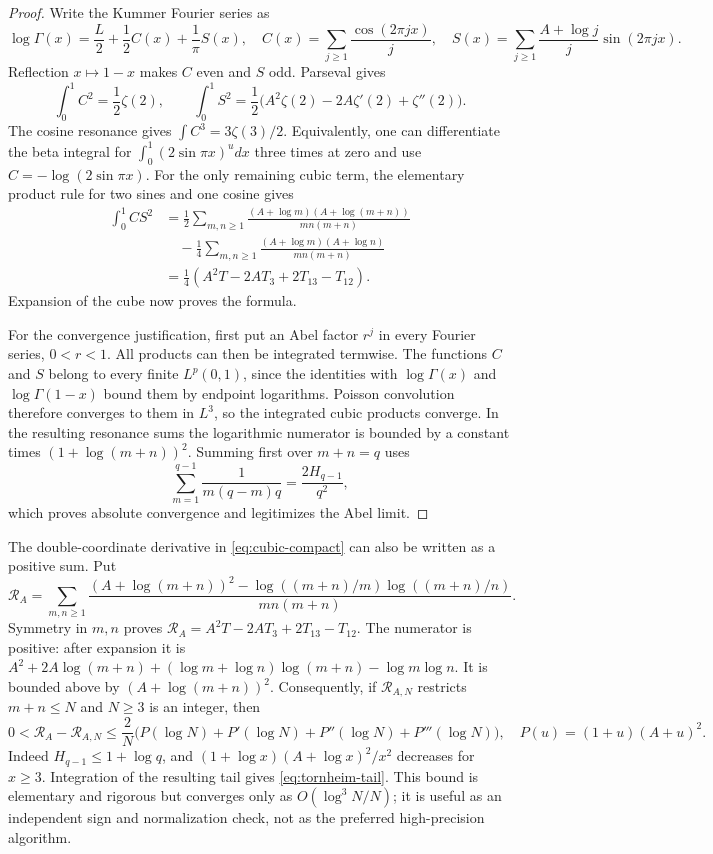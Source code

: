 \begin{proof}
Write the Kummer Fourier series as
\[
 \log\Gamma(x)=\frac L2+\frac12 C(x)+\frac1\pi S(x),
 \quad C(x)=\sum_{j\ge1}\frac{\cos(2\pi jx)}j,
 \quad S(x)=\sum_{j\ge1}\frac{A+\log j}{j}\sin(2\pi jx).
\]
Reflection $x\mapsto1-x$ makes $C$ even and $S$ odd.  Parseval gives
\[
 \int_0^1 C^2=\frac12\zeta(2),\qquad
 \int_0^1 S^2=\frac12\bigl(A^2\zeta(2)-2A\zeta'(2)+\zeta''(2)\bigr).
\]
The cosine resonance gives $\int C^3=3\zeta(3)/2$.  Equivalently, one can
differentiate the beta integral for $\int_0^1(2\sin\pi x)^u dx$ three times
at zero and use $C=-\log(2\sin\pi x)$.
For the only remaining cubic term, the elementary product rule for two sines
and one cosine gives
\begin{align*}
 \int_0^1 CS^2
 &=\frac12\sum_{m,n\ge1}
   \frac{(A+\log m)(A+\log(m+n))}{mn(m+n)}\\
 &\hspace{1em}-\frac14\sum_{m,n\ge1}
   \frac{(A+\log m)(A+\log n)}{mn(m+n)}\\
 &=\frac14\left(A^2T-2AT_3+2T_{13}-T_{12}\right).
\end{align*}
Expansion of the cube now proves the formula.

For the convergence justification, first put an Abel factor $r^j$ in every
Fourier series, $0<r<1$.  All products can then be integrated termwise.
The functions $C$ and $S$ belong to every finite $L^p(0,1)$, since the
identities with $\log\Gamma(x)$ and $\log\Gamma(1-x)$ bound them by
endpoint logarithms.  Poisson convolution therefore converges to them in
$L^3$, so the integrated cubic products converge.  In the resulting
resonance sums the logarithmic numerator is bounded by a constant times
$(1+\log(m+n))^2$.  Summing first over $m+n=q$ uses
\[
 \sum_{m=1}^{q-1}\frac{1}{m(q-m)q}=\frac{2H_{q-1}}{q^2},
\]
which proves absolute convergence and legitimizes the Abel limit.
\end{proof}

The double-coordinate derivative in \eqref{eq:cubic-compact} can also be
written as a positive sum.  Put
\[
 \mathcal R_A=\sum_{m,n\ge1}
 \frac{(A+\log(m+n))^2-
 \log((m+n)/m)\log((m+n)/n)}{mn(m+n)}.
\]
Symmetry in $m,n$ proves
$\mathcal R_A=A^2T-2AT_3+2T_{13}-T_{12}$.
The numerator is positive: after expansion it is
$A^2+2A\log(m+n)+(\log m+\log n)\log(m+n)-\log m\log n$.
It is bounded above by $(A+\log(m+n))^2$.
Consequently, if $\mathcal R_{A,N}$ restricts $m+n\le N$ and $N\ge3$ is an integer, then
\begin{equation}
 0<\mathcal R_A-\mathcal R_{A,N}
 \le\frac2N\bigl(P(\log N)+P'(\log N)+P''(\log N)+P'''(\log N)\bigr),
 \quad P(u)=(1+u)(A+u)^2.
 \label{eq:tornheim-tail}
\end{equation}
Indeed $H_{q-1}\le1+\log q$, and
$(1+\log x)(A+\log x)^2/x^2$ decreases for $x\ge3$.
Integration of the resulting tail gives \eqref{eq:tornheim-tail}.
This bound is elementary and rigorous but converges only as
$O(\log^3N/N)$; it is useful as an independent sign and normalization check,
not as the preferred high-precision algorithm.

